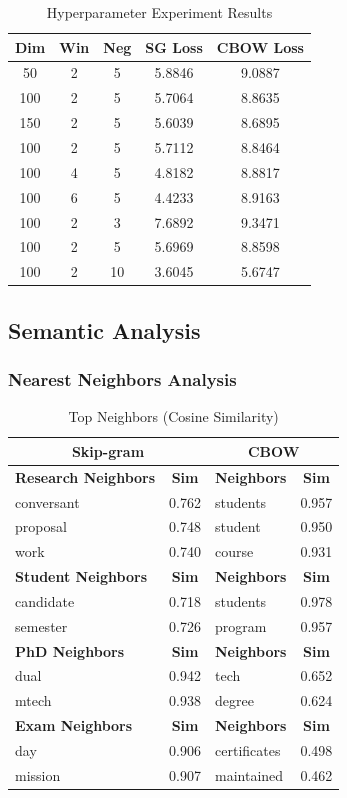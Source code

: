 \documentclass[12pt,a4paper]{article}
\begin{document}
\begin{table}[H]
\centering
\small
\begin{tabular}{|c|c|c|c|c|}
\hline
\textbf{Dim} & \textbf{Win} & \textbf{Neg} & \textbf{SG Loss} & \textbf{CBOW Loss} \\
\hline
50 & 2 & 5 & 5.8846 & 9.0887 \\
100 & 2 & 5 & 5.7064 & 8.8635 \\
150 & 2 & 5 & 5.6039 & 8.6895 \\
100 & 2 & 5 & 5.7112 & 8.8464 \\
100 & 4 & 5 & 4.8182 & 8.8817 \\
100 & 6 & 5 & 4.4233 & 8.9163 \\
100 & 2 & 3 & 7.6892 & 9.3471 \\
100 & 2 & 5 & 5.6969 & 8.8598 \\
100 & 2 & 10 & 3.6045 & 5.6747 \\
\hline
\end{tabular}
\caption{Hyperparameter Experiment Results}
\end{table}

\subsection{Semantic Analysis}

\subsubsection{Nearest Neighbors Analysis}

\begin{table}[H]
\centering
\small
\begin{tabular}{|l|c|l|c|}
\hline
\multicolumn{2}{|c|}{\textbf{Skip-gram}} & \multicolumn{2}{|c|}{\textbf{CBOW}} \\
\hline
\textbf{Research Neighbors} & \textbf{Sim} & \textbf{Neighbors} & \textbf{Sim} \\
conversant & 0.762 & students & 0.957 \\
proposal & 0.748 & student & 0.950 \\
work & 0.740 & course & 0.931 \\
\hline
\textbf{Student Neighbors} & \textbf{Sim} & \textbf{Neighbors} & \textbf{Sim} \\
candidate & 0.718 & students & 0.978 \\
semester & 0.726 & program & 0.957 \\
\hline
\textbf{PhD Neighbors} & \textbf{Sim} & \textbf{Neighbors} & \textbf{Sim} \\
dual & 0.942 & tech & 0.652 \\
mtech & 0.938 & degree & 0.624 \\
\hline
\textbf{Exam Neighbors} & \textbf{Sim} & \textbf{Neighbors} & \textbf{Sim} \\
day & 0.906 & certificates & 0.498 \\
mission & 0.907 & maintained & 0.462 \\
\hline
\end{tabular}
\caption{Top Neighbors (Cosine Similarity)}
\end{table}
\end{document}
